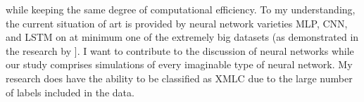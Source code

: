 \documentclass[a4paper]{article}
\begin{document}
while keeping the same degree of \cite{bib7}   computational efficiency. To my understanding, the current situation of art is provided by neural network varieties MLP, CNN, and LSTM on at minimum one of the extremely big datasets (as demonstrated in the research by \cite{bib15}]. I want to contribute to the discussion of neural networks while our study comprises simulations of every imaginable type of neural network. My research does have the ability to be classified as XMLC due to the large number of labels included in the data.

\eightpt


	
\end{document}
